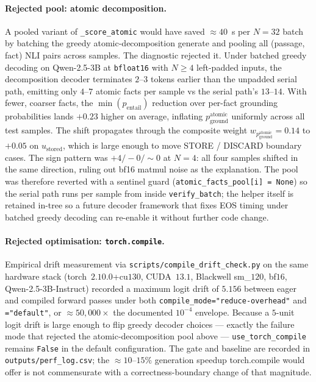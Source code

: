 \paragraph{Rejected pool: atomic decomposition.}
\label{par:perf-atomic-rejection}
A pooled variant of \texttt{\_score\_atomic} would have saved
$\approx 40$~s per $N = 32$ batch by batching the greedy
atomic-decomposition generate and pooling all (passage, fact) NLI
pairs across samples. The diagnostic rejected it. Under batched
greedy decoding on Qwen-2.5-3B at \texttt{bfloat16} with $N \ge 4$
left-padded inputs, the decomposition decoder terminates $2$--$3$
tokens earlier than the unpadded serial path, emitting only $4$--$7$
atomic facts per sample vs the serial path's $13$--$14$. With fewer,
coarser facts, the $\min(p_{\text{entail}})$ reduction over per-fact
grounding probabilities lands $+0.23$ higher on average, inflating
$p_{\text{ground}}^{\text{atomic}}$ uniformly across all test
samples. The shift propagates through the composite weight
$w_{p_{\text{ground}}^{\text{atomic}}} = 0.14$ to $+0.05$ on
$u_{\text{stored}}$, which is large enough to move STORE / DISCARD
boundary cases. The sign pattern was $+4 / -0 / {\sim}0$ at $N = 4$:
all four samples shifted in the same direction, ruling out bf16
matmul noise as the explanation. The pool was therefore reverted
with a sentinel guard (\texttt{atomic\_facts\_pool[i] = None}) so the
serial path runs per sample from inside \texttt{verify\_batch}; the
helper itself is retained in-tree so a future decoder framework that
fixes EOS timing under batched greedy decoding can re-enable it
without further code change.

\paragraph{Rejected optimisation: \texttt{torch.compile}.}
Empirical drift measurement via
\texttt{scripts/compile\_drift\_check.py} on the same hardware stack
(torch~$2.10.0$+cu$130$, CUDA~$13.1$, Blackwell sm\_$120$, bf$16$,
Qwen-2.5-3B-Instruct) recorded a maximum logit drift of
$\mathbf{5.156}$ between eager and compiled forward passes under both
\texttt{compile\_mode="reduce-overhead"} and \texttt{="default"},
or $\approx 50{,}000{\times}$ the documented $10^{-4}$ envelope.
Because a $5$-unit logit drift is large enough to flip greedy
decoder choices --- exactly the failure mode that rejected the
atomic-decomposition pool above --- \texttt{use\_torch\_compile}
remains \texttt{False} in the default configuration. The gate and
baseline are recorded in \texttt{outputs/perf\_log.csv}; the
$\approx 10$--$15\%$ generation speedup torch.compile would offer is
not commensurate with a correctness-boundary change of that
magnitude.

